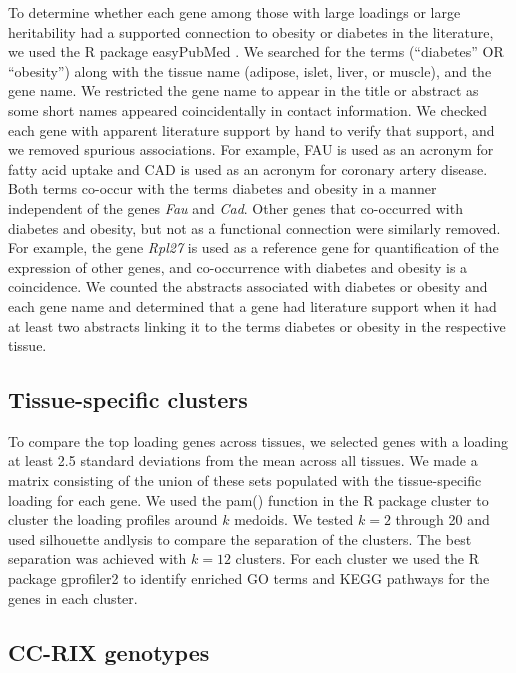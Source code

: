 \documentclass[
]{article}
\begin{document}
To determine whether each gene among those with large loadings or large
heritability had a supported connection to obesity or diabetes in the
literature, we used the R package easyPubMed \cite{easyPubMed}. We
searched for the terms (``diabetes'' OR ``obesity'') along with the
tissue name (adipose, islet, liver, or muscle), and the gene name. We
restricted the gene name to appear in the title or abstract as some
short names appeared coincidentally in contact information. We checked
each gene with apparent literature support by hand to verify that
support, and we removed spurious associations. For example, FAU is used
as an acronym for fatty acid uptake and CAD is used as an acronym for
coronary artery disease. Both terms co-occur with the terms diabetes and
obesity in a manner independent of the genes \textit{Fau} and
\textit{Cad}. Other genes that co-occurred with diabetes and obesity,
but not as a functional connection were similarly removed. For example,
the gene \textit{Rpl27} is used as a reference gene for quantification
of the expression of other genes, and co-occurrence with diabetes and
obesity is a coincidence. We counted the abstracts associated with
diabetes or obesity and each gene name and determined that a gene had
literature support when it had at least two abstracts linking it to the
terms diabetes or obesity in the respective tissue.

\subsection{Tissue-specific clusters}\label{tissue-specific-clusters}

To compare the top loading genes across tissues, we selected genes with
a loading at least 2.5 standard deviations from the mean across all
tissues. We made a matrix consisting of the union of these sets
populated with the tissue-specific loading for each gene. We used the
pam() function in the R package cluster \cite{Rcluster} to cluster the
loading profiles around \(k\) medoids. We tested \(k = 2\) through 20
and used silhouette andlysis to compare the separation of the clusters.
The best separation was achieved with \(k = 12\) clusters. For each
cluster we used the R package gprofiler2 \cite{Rgprofiler2} to identify
enriched GO terms and KEGG pathways for the genes in each cluster.

\subsection{CC-RIX genotypes}\label{cc-rix-genotypes}
\end{document}
